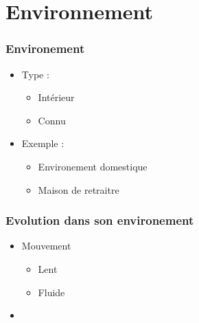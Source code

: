 \section{Environnement}

\begin{frame}
	\frametitle{Environement}
	\begin{itemize}
	\item Type :
		\begin{itemize}
		\item Intérieur
		\item Connu
		\end{itemize}
	\item Exemple :
		\begin{itemize}
		\item Environement domestique
		\item Maison de retraitre 
		\end{itemize}
	\end{itemize}
\end{frame}

\begin{frame}
	\frametitle{Evolution dans son environement}
	\begin{itemize}
	\item Mouvement
		\begin{itemize}
		\item Lent
		\item Fluide
		\end{itemize}
	\item
	
	\end{itemize}
\end{frame}
